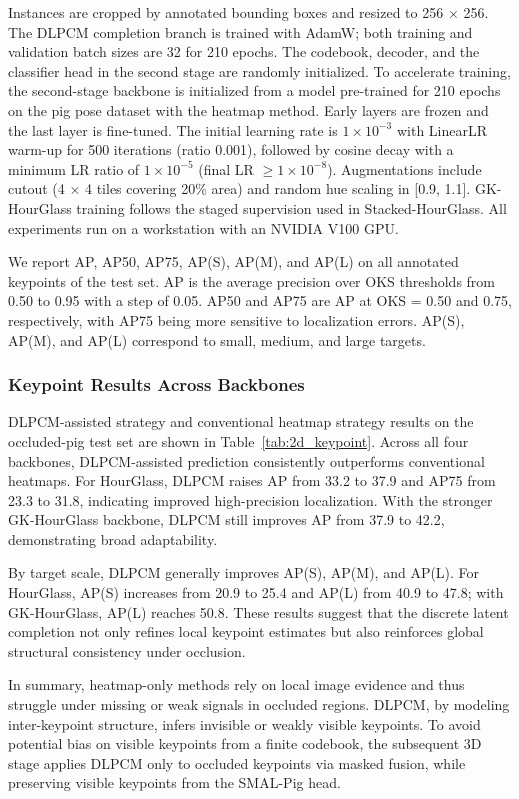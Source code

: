 \documentclass[computers,article,submit,pdftex,moreauthors]{mdpi}
\begin{document}
Instances are cropped by annotated bounding boxes and resized to 256 × 256. The DLPCM completion branch is trained with AdamW; both training and validation batch sizes are 32 for 210 epochs. The codebook, decoder, and the classifier head in the second stage are randomly initialized. To accelerate training, the second-stage backbone is initialized from a model pre-trained for 210 epochs on the pig pose dataset with the heatmap method. Early layers are frozen and the last layer is fine-tuned. The initial learning rate is $1 \times 10^{-3}$ with LinearLR warm-up for 500 iterations (ratio 0.001), followed by cosine decay with a minimum LR ratio of $1 \times 10^{-5}$ (final LR $\geq 1 \times 10^{-8}$). Augmentations include cutout (4 × 4 tiles covering 20\% area) and random hue scaling in [0.9, 1.1]. GK-HourGlass training follows the staged supervision used in Stacked-HourGlass. All experiments run on a workstation with an NVIDIA V100 GPU.

We report AP, AP50, AP75, AP(S), AP(M), and AP(L) on all annotated keypoints of the test set. AP is the average precision over OKS thresholds from 0.50 to 0.95 with a step of 0.05. AP50 and AP75 are AP at OKS = 0.50 and 0.75, respectively, with AP75 being more sensitive to localization errors. AP(S), AP(M), and AP(L) correspond to small, medium, and large targets.

\subsubsection{Keypoint Results Across Backbones}\label{sec:2d_results}

DLPCM-assisted strategy and conventional heatmap strategy results on the occluded-pig test set are shown in Table~\ref{tab:2d_keypoint}. Across all four backbones, DLPCM-assisted prediction consistently outperforms conventional heatmaps. For HourGlass, DLPCM raises AP from 33.2 to 37.9 and AP75 from 23.3 to 31.8, indicating improved high-precision localization. With the stronger GK-HourGlass backbone, DLPCM still improves AP from 37.9 to 42.2, demonstrating broad adaptability.

By target scale, DLPCM generally improves AP(S), AP(M), and AP(L). For HourGlass, AP(S) increases from 20.9 to 25.4 and AP(L) from 40.9 to 47.8; with GK-HourGlass, AP(L) reaches 50.8. These results suggest that the discrete latent completion not only refines local keypoint estimates but also reinforces global structural consistency under occlusion.

In summary, heatmap-only methods rely on local image evidence and thus struggle under missing or weak signals in occluded regions. DLPCM, by modeling inter-keypoint structure, infers invisible or weakly visible keypoints. To avoid potential bias on visible keypoints from a finite codebook, the subsequent 3D stage applies DLPCM only to occluded keypoints via masked fusion, while preserving visible keypoints from the SMAL-Pig head.
\end{document}
